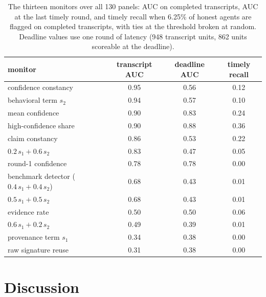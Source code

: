 \documentclass[pdflatex,sn-mathphys-num]{sn-jnl}
\theoremstyle{thmstyleone}%
\begin{document}
\begin{table}[!tbp]
  \caption{The thirteen monitors over all 130 panels: AUC on completed transcripts, AUC at the last timely round, and timely recall when 6.25\% of honest agents are flagged on completed transcripts, with ties at the threshold broken at random. Deadline values use one round of latency (948 transcript units, 862 units scoreable at the deadline).}
  \label{tab:zoo}
  \small
  \begin{tabular}{lccc}
    \toprule
    monitor & transcript AUC & deadline AUC & timely recall \\
    \midrule
    confidence constancy & 0.95 & 0.56 & 0.12 \\
    behavioral term $s_2$ & 0.94 & 0.57 & 0.10 \\
    mean confidence & 0.90 & 0.83 & 0.24 \\
    high-confidence share & 0.90 & 0.88 & 0.36 \\
    claim constancy & 0.86 & 0.53 & 0.22 \\
    $0.2\,s_1 + 0.6\,s_2$ & 0.83 & 0.47 & 0.05 \\
    round-1 confidence & 0.78 & 0.78 & 0.00 \\
    benchmark detector ($0.4\,s_1 + 0.4\,s_2$) & 0.68 & 0.43 & 0.01 \\
    $0.5\,s_1 + 0.5\,s_2$ & 0.68 & 0.43 & 0.01 \\
    evidence rate & 0.50 & 0.50 & 0.06 \\
    $0.6\,s_1 + 0.2\,s_2$ & 0.49 & 0.39 & 0.01 \\
    provenance term $s_1$ & 0.34 & 0.38 & 0.00 \\
    raw signature reuse & 0.31 & 0.38 & 0.00 \\
    \bottomrule
  \end{tabular}
\end{table}

\section{Discussion}
\label{sec:discussion}
\end{document}
